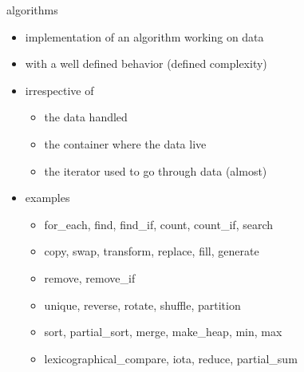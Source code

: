 \begin{frame}[fragile]
  \begin{block}{algorithms}
    \begin{itemize}
    \item implementation of an algorithm working on data
    \item with a well defined behavior (defined complexity)
    \item irrespective of
      \begin{itemize}
      \item the data handled
      \item the container where the data live
      \item the iterator used to go through data (almost)
      \end{itemize}
    \item examples
      \begin{itemize}
      \item for\_each, find, find\_if, count, count\_if, search
      \item copy, swap, transform, replace, fill, generate
      \item remove, remove\_if
      \item unique, reverse, rotate, shuffle, partition
      \item sort, partial\_sort, merge, make\_heap, min, max
      \item lexicographical\_compare, iota, reduce, partial\_sum
      \end{itemize}
    \end{itemize}
  \end{block}
\end{frame}

